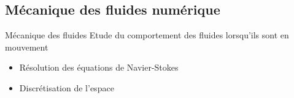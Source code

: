 \documentclass{beamer}
\begin{document}
\subsection{Mécanique des fluides numérique}
\begin{frame}
  \begin{block}{Mécanique des fluides}
    Etude du comportement des fluides lorsqu'ils sont en mouvement
  \end{block}
  
  \begin{itemize}
  \item Résolution des équations de Navier-Stokes
  \item Discrétisation de l'espace
  \end{itemize}
\end{frame}
\end{document}
